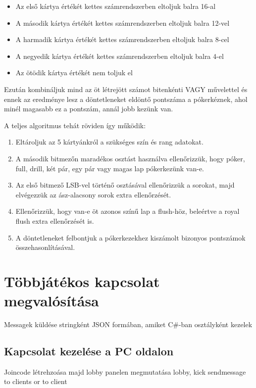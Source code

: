 \documentclass[]{thesis-ekf}
\theoremstyle{definition}
\theoremstyle{remark}
\begin{document}
\begin{enumerate}
\begin{itemize}
		\begin{itemize}
			\item Az első kártya értékét kettes számrendszerben eltoljuk balra 16-al
			\item A második kártya értékét kettes számrendszerben eltoljuk balra 12-vel
			\item A harmadik kártya értékét kettes számrendszerben eltoljuk balra 8-cel
			\item A negyedik kártya értékét kettes számrendszerben eltoljuk balra 4-el
			\item Az ötödik kártya értékét nem toljuk el
		\end{itemize}  
		Ezután kombináljuk mind az öt létrejött számot bitenkénti VAGY művelettel és ennek az eredménye lesz a döntetleneket eldöntő pontszáma a pókerkéznek, ahol minél magasabb ez a pontszám, annál jobb kezünk van.
	\end{itemize}
	
\end{enumerate}

A teljes algoritmus tehát röviden így működik:

\begin{enumerate}
	\item Eltároljuk az 5 kártyánkról a szükséges szín és rang adatokat.
	\item A második bitmezőn maradékos osztást használva ellenőrizzük, hogy póker, full, drill, két pár, egy pár vagy magas lap pókerkezünk van-e.
	\item Az első bitmező LSB-vel történő osztásával ellenőrizzük a sorokat, majd elvégezzük az ász-alacsony sorok extra ellenőrzését.
	\item Ellenőrizzük, hogy van-e öt azonos színű lap a flush-höz, beleértve a royal flush extra ellenőrzését is.
	\item A döntetleneket felbontjuk a pókerkezekhez kiszámolt bizonyos pontszámok összehasonlításával.
\end{enumerate}

\section{Többjátékos kapcsolat megvalósítása}
\label{sec-tobbjatekoskapcsolat}
Messagek küldése stringként JSON formában, amiket C\#-ban osztályként kezelek
\subsection{Kapcsolat kezelése a PC oldalon}
Joincode létrehzoása majd lobby panelen megmutatása
lobby, kick
sendmessage to clients or to client
\end{document}
